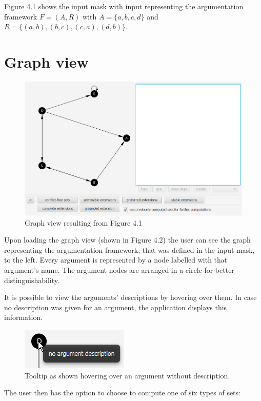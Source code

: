 \documentclass[draft,final]{vutinfth} %
\newcommand{\hl}{\par\vspace{6pt}} %
\begin{document}
Figure 4.1 shows the input mask with input representing the argumentation framework $F=(A,R)$ with $A=\{a,b,c,d\}$ and $R=\{(a,b),(b,c),(c,a),(d,b)\}$.\hl

\section{Graph view}

\FloatBarrier
	\begin{figure}[!h]
		\centering
		\includegraphics[width=\linewidth]{pics/graph.png}
		\caption{Graph view resulting from Figure 4.1}
	\end{figure}
\FloatBarrier

Upon loading the graph view (shown in Figure 4.2) the user can see the graph representing the argumentation framework, that was defined in the input mask, to the left. Every argument is represented by a node labelled with that argument's name. The argument nodes are arranged in a circle for better distinguishability.\hl
It is possible to view the arguments' descriptions by hovering over them. In case no description was given for an argument, the application displays this information.\hl

\FloatBarrier
	\begin{figure}[!h]
		\centering
		\includegraphics[scale=2]{pics/argdes.png}
		\caption{Tooltip as shown hovering over an argument without description.}
	\end{figure}
\FloatBarrier

The user then has the option to choose to compute one of six types of sets:
\end{document}
